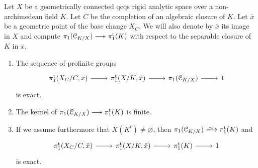 \begin{prop} 
\label{prop:weak-fundamental-exact-seq}
    Let $X$ be a geometrically connected qcqs rigid analytic space over a non-archimedean field $K$. Let $C$ be the completion of an algebraic closure of $K$.  Let $\bar x$ be a geometric point of the base change $X_C$. We will also denote by $\bar x$ its image in $X$ and compute $\pi_1(\cC_{K/X}) \surj \pitame(K)$ with respect to the separable closure of $K$ in $\bar x$. 
    \begin{enumerate}[ref=(\arabic*)]
        \item 
        \label{propitem:weak-fes ct version}
        The sequence of profinite groups
        \begin{equation}
            \label{eq:homotopy exact sequence ct version}
            \begin{tikzcd}
                \pitame(X_C/C, \bar x)\ar[r] & \pitame(X/K, \bar x) \ar[r] & \pi_1(\cC_{K/X}) \ar[r] & 1           
            \end{tikzcd}
        \end{equation}        
        is exact.
        \item \label{propitem:finite kernel}
        The kernel of $\pi_1(\cC_{K/X}) \surj \pitame(K)$ is finite.
        \item 
        \label{propitem:weak-fes}
        If we assume furthermore that $X(K^t) \not= \varnothing$, then 
        $\pi_1(\cC_{K/X})\isomto \pitame(K)$ and
        \begin{equation}
            \label{eq:homotopy exact sequence}
            \begin{tikzcd}
                \pitame(X_C/C, \bar x)\ar[r] & \pitame(X/K, \bar x) \ar[r] & \pitame(K) \ar[r] & 1   
            \end{tikzcd}
        \end{equation}        
        is exact.
    \end{enumerate}
\end{prop}


